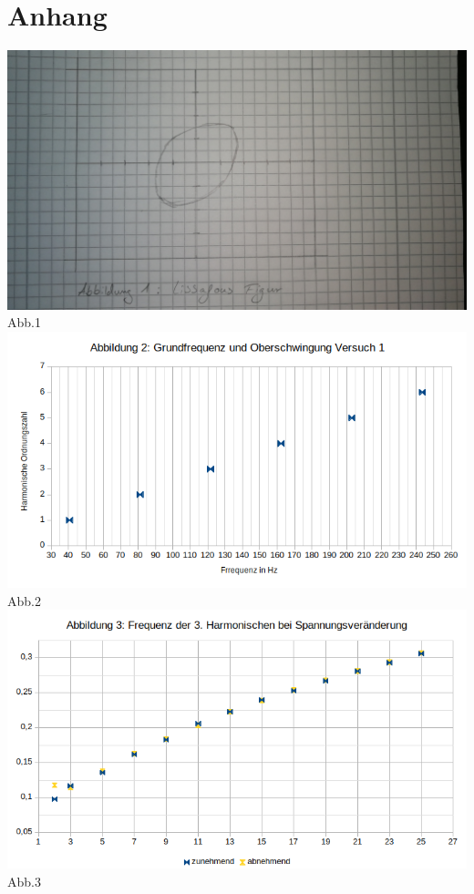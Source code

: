 \documentclass[11pt, a4Paper]{article}
\begin{document}
\section{Anhang}
\includegraphics[scale=0.1]{Abb1.jpg}\\
Abb.1 \\
\includegraphics[scale=0.7]{Abb2.png}\\
Abb.2 \\
\includegraphics[scale=0.7]{Abb3.png}\\
Abb.3 \\
\end{document}
